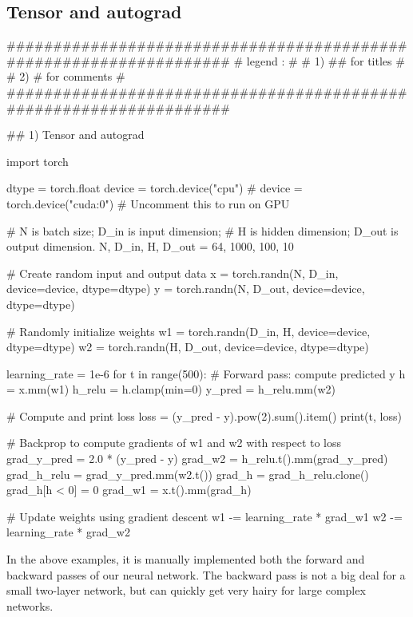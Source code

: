 \documentclass[11pt]{article}
\begin{document}
\subsection{Tensor and autograd}
\begin{python}
###################################################################
# legend :                                                        #
#         1) ## for titles                                        #
#         2) #  for comments                                      #
###################################################################   

## 1) Tensor and autograd

import torch


dtype = torch.float
device = torch.device("cpu")
# device = torch.device("cuda:0") # Uncomment this to run on GPU

# N is batch size; D_in is input dimension;
# H is hidden dimension; D_out is output dimension.
N, D_in, H, D_out = 64, 1000, 100, 10

# Create random input and output data
x = torch.randn(N, D_in, device=device, dtype=dtype)
y = torch.randn(N, D_out, device=device, dtype=dtype)

# Randomly initialize weights
w1 = torch.randn(D_in, H, device=device, dtype=dtype)
w2 = torch.randn(H, D_out, device=device, dtype=dtype)

learning_rate = 1e-6
for t in range(500):
    # Forward pass: compute predicted y
    h = x.mm(w1)
    h_relu = h.clamp(min=0)
    y_pred = h_relu.mm(w2)

    # Compute and print loss
    loss = (y_pred - y).pow(2).sum().item()
    print(t, loss)

    # Backprop to compute gradients of w1 and w2 with respect to loss
    grad_y_pred = 2.0 * (y_pred - y)
    grad_w2 = h_relu.t().mm(grad_y_pred)
    grad_h_relu = grad_y_pred.mm(w2.t())
    grad_h = grad_h_relu.clone()
    grad_h[h < 0] = 0
    grad_w1 = x.t().mm(grad_h)

    # Update weights using gradient descent
    w1 -= learning_rate * grad_w1
    w2 -= learning_rate * grad_w2
\end{python}{}
In  the above examples, it is  manually implemented both the forward and backward passes of our neural network. The backward pass is not a big deal for a small two-layer network, but can quickly get very hairy for large complex networks.
\end{document}
